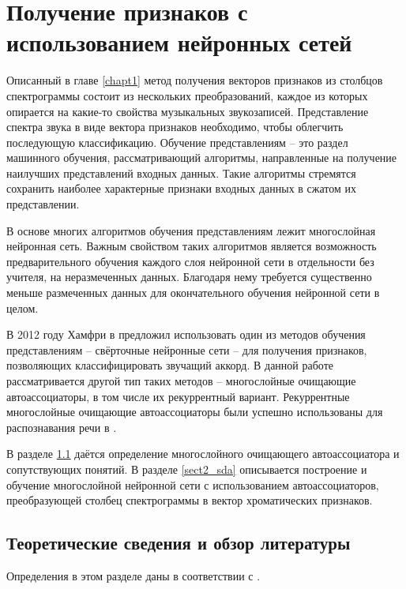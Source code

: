 \chapter{Получение признаков с использованием нейронных сетей}
\label{chapt2}

Описанный в главе \ref{chapt1} метод получения векторов признаков из столбцов
спектрограммы состоит из нескольких преобразований, каждое из которых опирается
на какие-то свойства музыкальных звукозаписей. Представление спектра звука в
виде вектора признаков необходимо, чтобы облегчить последующую классификацию.
Обучение представлениям -- это раздел машинного обучения, рассматривающий
алгоритмы, направленные на получение наилучших представлений входных данных.
Такие алгоритмы стремятся сохранить наиболее характерные признаки входных данных
в сжатом их представлении.

В основе многих алгоритмов обучения представлениям лежит многослойная нейронная
сеть. Важным свойством таких алгоритмов является возможность предварительного
обучения каждого слоя нейронной сети в отдельности без учителя, на неразмеченных
данных. Благодаря нему требуется существенно меньше размеченных данных для
окончательного обучения нейронной сети в целом.

В 2012 году Хамфри в \cite{Humphrey2012} предложил использовать один из методов
обучения представлениям -- свёрточные нейронные сети -- для получения признаков,
позволяющих классифицировать звучащий аккорд. В данной работе рассматривается
другой тип таких методов -- многослойные очищающие автоассоциаторы, в том числе
их рекуррентный вариант. Рекуррентные многослойные очищающие автоассоциаторы
были успешно использованы для распознавания речи в \cite{Maas2012}.

В разделе \ref{sect2_theory} даётся определение многослойного очищающего
автоассоциатора и сопутствующих понятий. В разделе \ref{sect2_sda} описывается
построение и обучение многослойной нейронной сети с использованием
автоассоциаторов, преобразующей столбец спектрограммы в вектор хроматических
признаков.

\section{Теоретические сведения и обзор литературы} \label{sect2_theory}

Определения в этом разделе даны в соответствии с \cite{Vincent2010}.

